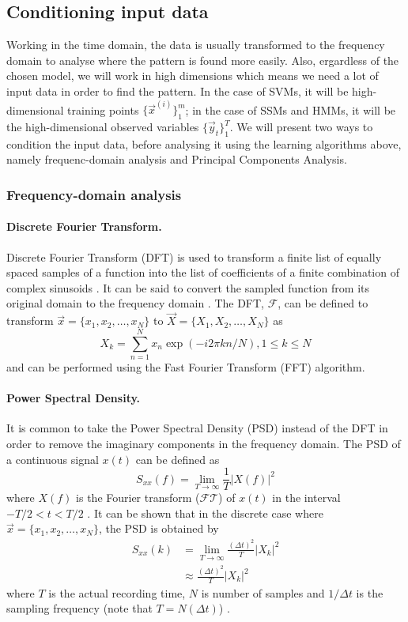 \subsection{Conditioning input data}
	Working in the time domain, the data is usually transformed to the frequency domain to analyse where the pattern is found more easily. Also, ergardless of the chosen model, we will work in high dimensions which means we need a lot of input data in order to find the pattern. In the case of SVMs, it will be high-dimensional training points $\{\vec x^{(i)}\}_1^m$; in the case of SSMs and HMMs, it will be the high-dimensional observed variables $\{\vec y_t\}_1^T$. We will present two ways to condition the input data, before analysing it using the learning algorithms above, namely frequenc-domain analysis and Principal Components Analysis.
	
	\subsubsection{Frequency-domain analysis}
		\paragraph{Discrete Fourier Transform.}
			Discrete Fourier Transform (DFT) is used to transform a finite list of equally spaced samples of a function into the list of coefficients of a finite combination of complex sinusoids \cite{wiki:DFT}. It can be said to convert the sampled function from its original domain to the frequency domain \cite{wiki:DFT}. The DFT, $\mathcal{F}$, can be defined to transform $\vec x = \{x_1, x_2, \dotsc, x_{N}\}$ to $\vec X = \{X_1, X_2, \dotsc, X_{N}\}$ as
			\begin{equation}
				X_k = \sum_{n = 1}^{N} x_n \exp{(-i2\pi k n / N)}, 1 \leq k \leq N
			\end{equation}
			and can be performed using the Fast Fourier Transform (FFT) algorithm.

		\paragraph{Power Spectral Density.}
			It is common to take the Power Spectral Density (PSD) instead of the DFT in order to remove the imaginary components in the frequency domain. The PSD of a continuous signal $x(t)$ can be defined as
			\begin{equation}
				S_{xx}(f) = \lim_{T \to \infty} \frac{1}{T} \left| X(f) \right|^2
			\end{equation}
			where $X(f)$ is the Fourier transform ($\mathcal{FT}$) of $x(t)$ in the interval $-T / 2 < t < T / 2$ \cite{hlt}. It can be shown that in the discrete case where $\vec x = \{x_1, x_2, \dotsc, x_{N}\}$, the PSD is obtained by
			\begin{align}
				S_{xx}(k) 	&= \lim_{T \to \infty} \frac{(\Delta t)^2}{T} |X_k|^2\\
							&\approx \frac{(\Delta t)^2}{T} |X_k|^2
			\end{align}
			where $T$ is the actual recording time, $N$ is number of samples and $1/\Delta t$ is the sampling frequency (note that $T = N(\Delta t)$) \cite{wiki:PSD}.

